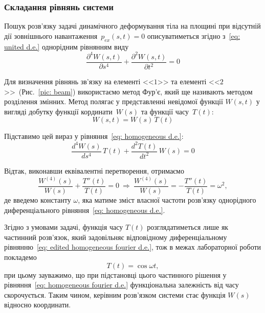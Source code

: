 \subsubsection*{Складання рівнянь системи}

Пошук розв'язку задачі динамічного деформування тіла на площині при відсутній дії зовнішнього навантаження~$p_{ex}(s,t)=0$ описуватиметься згідно з~\eqref{eq: united d.e.} однорідним рівнянням виду
\begin{equation}\label{eq: homogeneous d.e.}
    \frac{\partial^4 W(s,t)}{\partial s^4} + \frac{\partial^2 W(s,t)}{\partial t^2} = 0
\end{equation}

Для визначення рівнянь зв'язку на елементі <<$1$>> та елементі <<$2$>>~(Рис.~\ref{pic: beam}) використаємо метод Фур'є, який ще називають методом розділення змінних. Метод полягає у представленні невідомої функції $W(s,t)$ у вигляді добутку функції кординати~$W(s)$ та функції часу~$T(t):$ 
\begin{equation}\label{eq: fourier method}
    W(s,t) = W(s)\,T(t)
\end{equation}

Підставимо цей вираз у рівняння~\eqref{eq: homogeneous d.e.}:
\begin{equation}\label{eq: homogeneous fourier d.e.}
    \frac{d^4 W(s)}{d s^4}\,T(t) + \frac{d^2 T(t)}{d t^2}\,W(s) = 0
\end{equation}

Відтак, виконавши еквівалентні перетворення, отримаємо
\begin{equation}\label{eq: edited homogeneous fourier d.e.}
    \frac{W^{(4)}(s)}{W(s)} + \frac{T''(t)}{T(t)} = 0 \ \Longrightarrow \ \frac{W^{(4)}(s)}{W(s)} = - \frac{T''(t)}{T(t)} = \omega^2,
\end{equation}
де введемо константу $\omega$, яка матиме зміст власної частоти розв'язку однорідного диференціального рівняння~\eqref{eq: homogeneous d.e.}. 

Згідно з умовами задачі, функція часу $T(t)$ розглядатиметься лише як частинний розв'язок, який задовільняє відповідному диференціальному рівнянню~\eqref{eq: edited homogeneous fourier d.e.}, тож в межах лабораторної роботи покладемо
\begin{equation}\label{eq: T(t) assumption}
    T(t) = \cos{\omega t},
\end{equation}
при цьому зауважимо, що при підстановці цього частинного рішення у рівняння~\eqref{eq: homogeneous fourier d.e.} функціональна залежність від часу скорочується. Таким чином, керівним розв'язком системи стає функція $W(s)$ відносно координати. 

